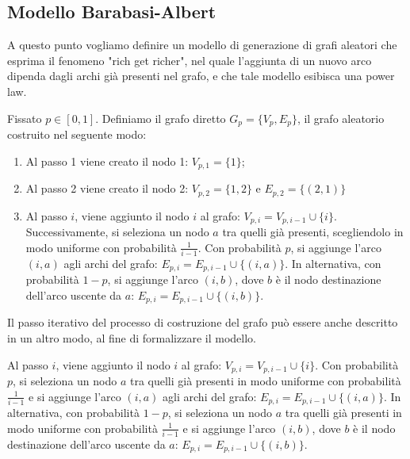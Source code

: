 \subsection{Modello Barabasi-Albert}

A questo punto vogliamo definire un modello di generazione di grafi aleatori che esprima il fenomeno "rich get richer", nel quale l'aggiunta di un nuovo arco dipenda dagli archi già presenti nel grafo, e che tale modello esibisca una power law.
\vspace{0.5cm}
\begin{definizione}
    Fissato $p \in [0, 1]$. Definiamo il grafo diretto $G_{p} = \{V_{p}, E_{p}\}$, il grafo aleatorio costruito nel seguente modo:
    \begin{enumerate}
        \item Al passo 1 viene creato il nodo 1: $V_{p,1} = \{1\}$;
        \item Al passo 2 viene creato il nodo 2: $V_{p,2} = \{1, 2\}$ e $E_{p,2} = \{(2, 1)\}$
        \item Al passo $i$, viene aggiunto il nodo $i$ al grafo: $V_{p,i} = V_{p, i-1} \cup \{i\}$. Successivamente, si seleziona un nodo $a$ tra quelli già presenti, scegliendolo in modo uniforme con probabilità $\frac{1}{i - 1}$. Con probabilità $p$, si aggiunge l'arco $(i, a)$ agli archi del grafo: $E_{p,i} = E_{p, i-1} \cup \{(i, a)\}$. In alternativa, con probabilità $1-p$, si aggiunge l'arco $(i, b)$, dove $b$ è il nodo destinazione dell'arco uscente da $a$: $E_{p,i} = E_{p, i-1} \cup \{(i, b)\}$.
    \end{enumerate}
\end{definizione}

 Il passo iterativo del processo di costruzione del grafo può essere anche descritto in un altro modo, al fine di formalizzare il modello.

 Al passo $i$, viene aggiunto il nodo $i$ al grafo: $V_{p,i} = V_{p, i-1} \cup \{i\}$. Con probabilità $p$, si seleziona un nodo $a$ tra quelli già presenti in modo uniforme con probabilità $\frac{1}{i - 1}$ e si aggiunge l'arco $(i, a)$ agli archi del grafo: $E_{p,i} = E_{p, i-1} \cup \{(i, a)\}$. In alternativa, con probabilità $1-p$, si seleziona un nodo $a$ tra quelli già presenti in modo uniforme con probabilità $\frac{1}{i - 1}$ e si aggiunge l'arco $(i, b)$, dove $b$ è il nodo destinazione dell'arco uscente da $a$: $E_{p,i} = E_{p, i-1} \cup \{(i, b)\}$.

\vspace{0.5cm}

